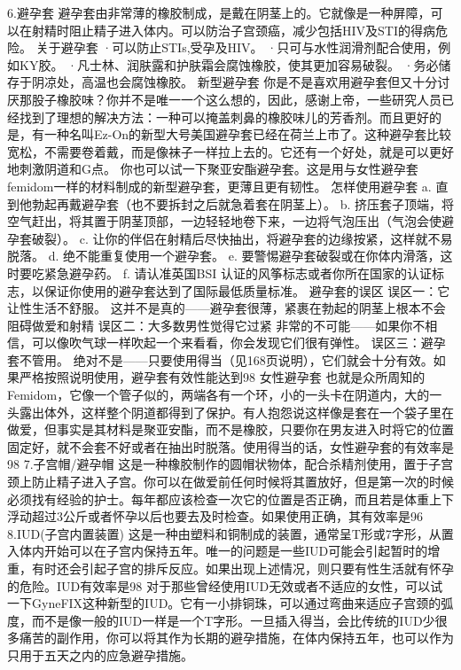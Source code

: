 \documentclass[12pt,UTF8,openany]{ctexbook}
\begin{document}
6.避孕套
避孕套由非常薄的橡胶制成，是戴在阴茎上的。它就像是一种屏障，可以在射精时阻止精子进入体内。可以防治子宫颈癌，减少包括HIV及STI的得病危险。
关于避孕套
·可以防止STIs,受孕及HIV。
·只可与水性润滑剂配合使用，例如KY胶。
·凡士林、润肤露和护肤霜会腐蚀橡胶，使其更加容易破裂。
·务必储存于阴凉处，高温也会腐蚀橡胶。
新型避孕套
你是不是喜欢用避孕套但又十分讨厌那股子橡胶味？你并不是唯一一个这么想的，因此，感谢上帝，一些研究人员已经找到了理想的解决方法：一种可以掩盖刺鼻的橡胶味儿的芳香剂。而且更好的是，有一种名叫Ez-On的新型大号美国避孕套已经在荷兰上市了。这种避孕套比较宽松，不需要卷着戴，而是像袜子一样拉上去的。它还有一个好处，就是可以更好地刺激阴道和G点。
你也可以试一下聚亚安酯避孕套。这是用与女性避孕套femidom一样的材料制成的新型避孕套，更薄且更有韧性。
怎样使用避孕套
a. 直到他勃起再戴避孕套（也不要拆封之后就急着套在阴茎上）。
b. 挤压套子顶端，将空气赶出，将其置于阴茎顶部，一边轻轻地卷下来，一边将气泡压出（气泡会使避孕套破裂）。
c. 让你的伴侣在射精后尽快抽出，将避孕套的边缘按紧，这样就不易脱落。
d. 绝不能重复使用一个避孕套。
e. 要警惕避孕套破裂或在你体内滑落，这时要吃紧急避孕药。
f. 请认准英国BSI 认证的风筝标志或者你所在国家的认证标志，以保证你使用的避孕套达到了国际最低质量标准。
避孕套的误区
误区一：它让性生活不舒服。
这并不是真的——避孕套很薄，紧裹在勃起的阴茎上根本不会阻碍做爱和射精
误区二：大多数男性觉得它过紧
非常的不可能——如果你不相信，可以像吹气球一样吹起一个来看看，你会发现它们很有弹性。
误区三：避孕套不管用。
绝对不是——只要使用得当（见168页说明），它们就会十分有效。如果严格按照说明使用，避孕套有效性能达到98%
女性避孕套
也就是众所周知的Femidom，它像一个管子似的，两端各有一个环，小的一头卡在阴道内，大的一头露出体外，这样整个阴道都得到了保护。有人抱怨说这样像是套在一个袋子里在做爱，但事实是其材料是聚亚安酯，而不是橡胶，只要你在男友进入时将它的位置固定好，就不会套不好或者在抽出时脱落。使用得当的话，女性避孕套的有效率是98%
7.子宫帽/避孕帽
这是一种橡胶制作的圆帽状物体，配合杀精剂使用，置于子宫颈上防止精子进入子宫。你可以在做爱前任何时候将其置放好，但是第一次的时候必须找有经验的护士。每年都应该检查一次它的位置是否正确，而且若是体重上下浮动超过3公斤或者怀孕以后也要去及时检查。如果使用正确，其有效率是96%
8.IUD(子宫内置装置)
这是一种由塑料和铜制成的装置，通常呈T形或7字形，从置入体内开始可以在子宫内保持五年。唯一的问题是一些IUD可能会引起暂时的增重，有时还会引起子宫的排斥反应。如果出现上述情况，则只要有性生活就有怀孕的危险。IUD有效率是98%
对于那些曾经使用IUD无效或者不适应的女性，可以试一下GyneFIX这种新型的IUD。它有一小排铜珠，可以通过弯曲来适应子宫颈的弧度，而不是像一般的IUD一样是一个T字形。一旦插入得当，会比传统的IUD少很多痛苦的副作用，你可以将其作为长期的避孕措施，在体内保持五年，也可以作为只用于五天之内的应急避孕措施。
\end{document}
